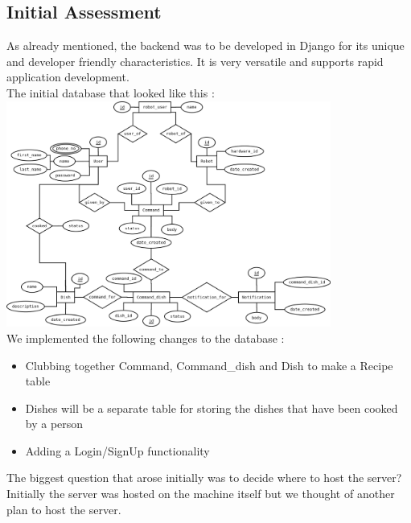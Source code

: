 \subsection{Initial Assessment}
{\normalsize As already mentioned, the backend was to be developed in Django for its unique and developer friendly characteristics. It is very versatile and supports rapid application development. \\[0.1in]
The initial database that looked like this : \\[0.1in]
\includegraphics[width=0.8\textwidth]{mechchef.png}\\
We implemented the following changes to the database : 
\begin{itemize}
    \item Clubbing together Command, Command\_dish and Dish to make a Recipe table
    \item Dishes will be a separate table for storing the dishes that have been cooked by a person 
    \item Adding a Login/SignUp functionality
\end{itemize}
The biggest question that arose initially was to decide where to host the server? Initially the server was hosted on the machine itself but we thought of another plan to host the server. 
}
